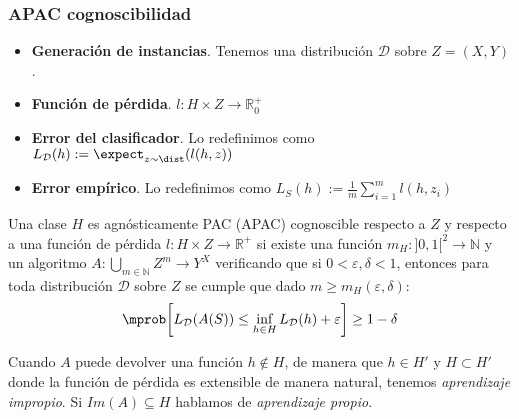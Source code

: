 \begin{frame}\frametitle{APAC cognoscibilidad}
 \begin{itemize}
  \item \textbf{Generación de instancias}. Tenemos una distribución $\mathcal{D}$ sobre $Z = (X,Y)$.
  \item \textbf{Función de pérdida}. $l : H \times Z \rightarrow \mathbb{R}_0^{+}$
  \item \textbf{Error del clasificador}. Lo redefinimos como $L_{\mathcal{D}}(h) :=  \expect_{z\sim \dist} (l(h,z))$
  \item \textbf{Error empírico}. Lo redefinimos como $L_{S} (h) := \frac{1}{m} \sum_{i=1}^m l(h,z_i)$
 \end{itemize}

 \begin{definition}
  Una clase $H$ es agnósticamente PAC (APAC) cognoscible respecto a $Z$ y respecto a una función de pérdida 
  $l: H \times Z \rightarrow \mathbb{R}^{+}$ si existe una función 
  $m_{H} : ]0,1[^2\rightarrow \mathbb{N}$ y un algoritmo 
  $A: \underset{m\in \mathbb{N}}{\bigcup} Z^m \rightarrow Y^X$ verificando que si 
  $0 < \varepsilon, \delta < 1$, entonces para toda distribución $\mathcal{D}$ sobre $Z$
  se cumple que dado $m\ge m_{H}(\varepsilon, \delta)$:
  \[\mprob \bigg[L_{\mathcal{D}}(A(S)) \le \inf_{h\in H} L_{\mathcal{D}}(h) + \varepsilon \bigg] \ge 1-\delta\]
 \end{definition}

 Cuando $A$ puede devolver una función  $h \notin H$, de manera que $h \in H'$ y  $H \subset H'$ 
 donde la función de pérdida es extensible de manera natural, tenemos
 \textit{aprendizaje impropio}. Si $Im(A) \subseteq H$ hablamos de \textit{aprendizaje propio}.
\end{frame}

